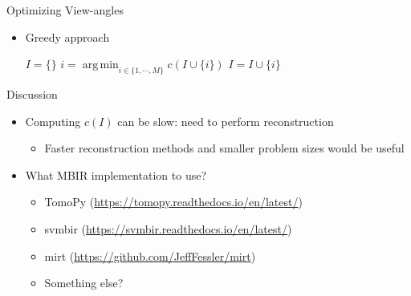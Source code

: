 \documentclass[english,aspectratio=169]{beamer}
\DeclareMathOperator*{\argmin}{arg\,min}
\begin{document}
\begin{frame}{Optimizing View-angles}
	\begin{itemize}
	    \setlength\itemsep{2em}
		\item Greedy approach
		
		\begin{algorithm}[H]
        \begin{algorithmic}[1]
        \STATE $I = \{\}$
            \STATE  $i = \argmin_{i \in \{1,\cdots,M \} } c(I \cup \{ i \})$
            \STATE $I = I \cup \{ i \}$
        \ENDWHILE
        
        \end{algorithmic}
        \label{alg:angle_greedy}
        \end{algorithm}
        
	\end{itemize}
	
\end{frame}


\begin{frame}{Discussion}
	\begin{itemize}
	    \setlength\itemsep{2em}
		\item Computing $c(I)$ can be slow: need to perform reconstruction
		\begin{itemize}
		    \item Faster reconstruction methods and smaller problem sizes would be useful
	    \end{itemize}
		
		
	    \item What MBIR implementation to use?
	    \begin{itemize}
		    \item TomoPy (\url{https://tomopy.readthedocs.io/en/latest/})
		    \item svmbir (\url{https://svmbir.readthedocs.io/en/latest/})
		    \item mirt (\url{https://github.com/JeffFessler/mirt})
		    \item Something else?
	    \end{itemize}
        
	\end{itemize}
	
\end{frame}








\end{document}
